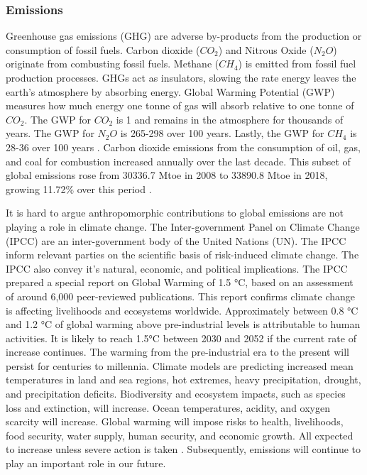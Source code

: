 \documentclass[12pt]{article}
\begin{document}
\subsubsection{Emissions}
Greenhouse gas emissions (GHG) are adverse by-products from the production or consumption of fossil fuels. 
Carbon dioxide ($CO_2$) and Nitrous Oxide ($N_2O$) originate from combusting fossil fuels. 
Methane ($CH_4$) is emitted from fossil fuel production processes. 
GHGs act as insulators, slowing the rate energy leaves the earth's atmosphere by absorbing energy. 
Global Warming Potential (GWP) measures how much energy one tonne of gas will absorb relative to one tonne of $CO_2$. 
The GWP for $CO_2$ is 1 and remains in the atmosphere for thousands of years. 
The GWP for $N_2O$ is 265-298 over 100 years. 
Lastly, the GWP for $CH_4$ is 28-36 over 100 years \cite{W:4}. 
Carbon dioxide emissions from the consumption of oil, gas, and coal for combustion increased annually over the last decade. 
This subset of global emissions rose from 30336.7 Mtoe in 2008 to 33890.8 Mtoe in 2018, growing 11.72\% over this period \cite{TR:3}. 

It is hard to argue anthropomorphic contributions to global emissions are not playing a role in climate change. 
The Inter-government Panel on Climate Change (IPCC) are an inter-government body of the United Nations (UN). 
The IPCC inform relevant parties on the scientific basis of risk-induced climate change.
The IPCC also convey it's natural, economic, and political implications. 
The IPCC prepared a special report on Global Warming of 1.5 \si{\degree}C, based on an assessment of around 6,000 peer-reviewed publications. 
This report confirms climate change is affecting livelihoods and ecosystems worldwide.
Approximately between 0.8 \si{\degree}C and 1.2 \si{\degree}C of global warming above pre-industrial levels is attributable to human activities. 
It is likely to reach 1.5\si{\degree}C between 2030 and 2052 if the current rate of increase continues. 
The warming from the pre-industrial era to the present will persist for centuries to millennia.
Climate models are predicting increased mean temperatures in land and sea regions, hot extremes, heavy precipitation, drought, and precipitation deficits. 
Biodiversity and ecosystem impacts, such as species loss and extinction, will increase. 
Ocean temperatures, acidity, and oxygen scarcity will increase. 
Global warming will impose risks to health, livelihoods, food security, water supply, human security, and economic growth.
All expected to increase unless severe action is taken \cite{TR:5}. 
Subsequently, emissions will continue to play an important role in our future.
\end{document}
